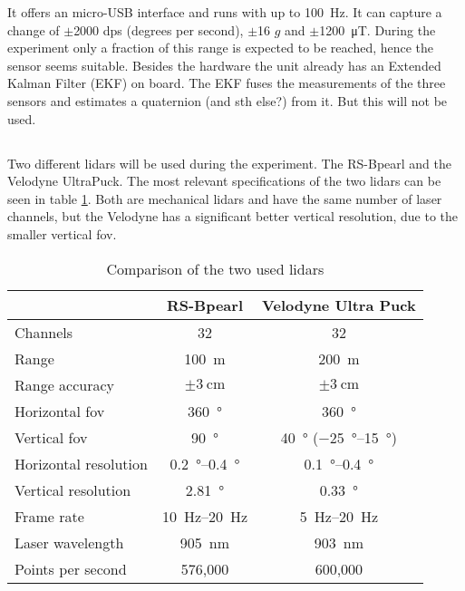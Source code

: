 It offers an micro-USB interface and runs with up to \SI{100}{\Hz}.
It can capture a change of $\pm$2000 dps (degrees per second), $\pm$16 $g$ and $\pm$\SI{1200}{\micro\tesla}.
During the experiment only a fraction of this range is expected to be reached, hence the sensor seems suitable.
Besides the hardware the unit already has an Extended Kalman Filter (EKF) on board.
The EKF fuses the measurements of the three sensors and estimates a quaternion (and sth else?) from it.
But this will not be used.


\subsection{}
Two different \gls{lidar}s will be used during the experiment.
The RS-Bpearl and the Velodyne UltraPuck.
The most relevant specifications of the two \gls{lidar}s can be seen in table \ref{tab:lidar_datasheets}.
Both are mechanical \gls{lidar}s and have the same number of laser channels, but the Velodyne has a significant better vertical resolution, due to the smaller vertical \gls{fov}.
\begin{table}[ht]
	\centering
	\caption{Comparison of the two used \acrshort{lidar}s \cite{RoboSense2020}\cite{Velodyne2018}}
	\label{tab:lidar_datasheets}
	\begin{tabular}[t]{lcc}
		\toprule
		&\textbf{RS-Bpearl} & \textbf{Velodyne Ultra Puck}\\
		\midrule
		Channels 					& 32 							& 32\\
		Range 						& \SI{100}{\metre}				& \SI{200}{\metre}\\
		Range accuracy				& $\pm\SI{3}{\centi\metre}$		& $\pm\SI{3}{\centi\metre}$\\
		Horizontal \gls{fov}	& \SI{360}{\degree}				& \SI{360}{\degree}\\
		Vertical \gls{fov} 	& \SI{90}{\degree} 				& \SI{40}{\degree} (\SIrange{-25}{15}{\degree})\\
		Horizontal resolution		& \SIrange{0.2}{0.4}{\degree} 	& \SIrange{0.1}{0.4}{\degree}\\
		Vertical resolution			& \SI{2.81}{\degree} 			& \SI{0.33}{\degree}\\
		Frame rate 					& \SIrange{10}{20}{\hertz}		& \SIrange{5}{20}{\hertz}\\
		Laser wavelength 			& \SI{905}{\nano\metre} 		& \SI{903}{\nano\metre}\\
		Points per second 			& 576,000						& 600,000		\\
		\bottomrule
	\end{tabular}
\end{table}%
